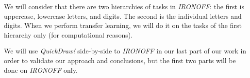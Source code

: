   \par We will consider that there are two hierarchies of tasks in \textit{IRONOFF}: the first is uppercase, lowercase letters, and digits. The second is the individual letters and digits. When we perform transfer learning, we will do it on the tasks of the first hierarchy only (for computational reasons).

  \par We will use \textit{QuickDraw!} side-by-side to \textit{IRONOFF} in our last part of our work in order to validate our approach and conclusions, but the first two parts will be done on \textit{IRONOFF} only.

